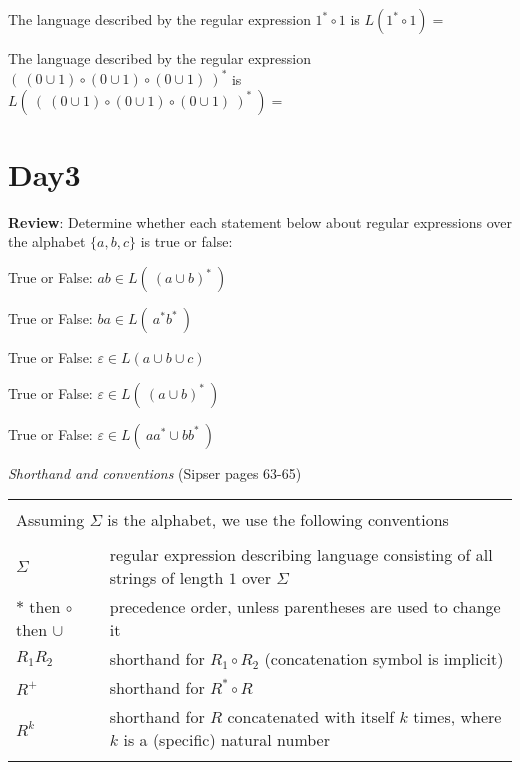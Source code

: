 \documentclass[12pt, oneside]{article}
\begin{document}
The language described by the regular expression $1^* \circ 1$ is $L(1^* \circ 1) = $

\vfill

The language described by the regular expression $(~(0 \cup 1) \circ (0 \cup 1) \circ (0 \cup 1) ~)^*$ 
is $L(~(~(0 \cup 1) \circ (0 \cup 1) \circ (0 \cup 1) ~)^*~) = $

\vfill
 \vfill
\section*{Day3}



{\bf Review}: Determine whether each statement below about regular expressions
over the alphabet $\{a,b,c\}$ is true or false:

\begin{comment}
True or False: \qquad 
   $a  \in L(~(a \cup b )~\cup c)$
\end{comment}

True or False: \qquad 
   $ab  \in L(~ (a \cup b)^*  ~)$
   
True or False: \qquad    
   $ba \in L( ~ a^* b^* ~)$
   
True or False: \qquad 
   $\varepsilon  \in L(a \cup b \cup c)$
   
True or False: \qquad 
   $\varepsilon  \in L(~ (a \cup b)^*  ~)$

True or False: \qquad 
   $\varepsilon \in L( ~ aa^* \cup bb^* ~)$

\vfill

{\it Shorthand and conventions} (Sipser pages 63-65)

\vspace{-20pt}

\begin{center}
    \begin{tabular}{|ll|}
    \hline
    & \\
    \multicolumn{2}{|l|}{Assuming $\Sigma$ is the alphabet, we use the following conventions}\\
    & \\
    $\Sigma$   & regular  expression describing language consisting of  all strings  of length  $1$ over $\Sigma$\\
    $*$ then $\circ$ then $\cup$   & precedence order, unless parentheses are used to change it\\
    $R_1R_2$ & shorthand  for  $R_1  \circ R_2$ (concatenation symbol is implicit) \\
    $R^+$ & shorthand for $R^* \circ R$ \\
    $R^k$ & shorthand for $R$ concatenated with itself $k$ times, where $k$ is a (specific) natural number\\
    & \\
    \hline
    \end{tabular}
\end{center}
\end{document}
